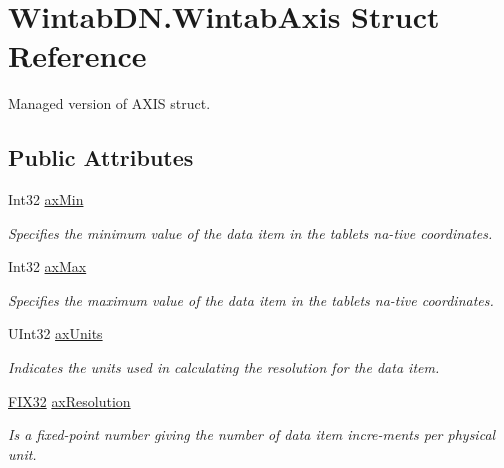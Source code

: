 \hypertarget{struct_wintab_d_n_1_1_wintab_axis}{}\section{Wintab\+D\+N.\+Wintab\+Axis Struct Reference}
\label{struct_wintab_d_n_1_1_wintab_axis}


Managed version of A\+X\+IS struct.  


\subsection*{Public Attributes}
\begin{DoxyCompactItemize}
\item 
Int32 \mbox{\hyperlink{struct_wintab_d_n_1_1_wintab_axis_a66135b352cd339fba0a8ab157d454d22}{ax\+Min}}
\begin{DoxyCompactList}\small\item\em Specifies the minimum value of the data item in the tablet\textquotesingle{}s na-\/tive coordinates. \end{DoxyCompactList}\item 
Int32 \mbox{\hyperlink{struct_wintab_d_n_1_1_wintab_axis_ad808a5058b80cd5b14e8dca275550cf7}{ax\+Max}}
\begin{DoxyCompactList}\small\item\em Specifies the maximum value of the data item in the tablet\textquotesingle{}s na-\/tive coordinates. \end{DoxyCompactList}\item 
U\+Int32 \mbox{\hyperlink{struct_wintab_d_n_1_1_wintab_axis_a571eed7c1e0ceb7cb44b1da7b2eaca69}{ax\+Units}}
\begin{DoxyCompactList}\small\item\em Indicates the units used in calculating the resolution for the data item. \end{DoxyCompactList}\item 
\mbox{\hyperlink{class_wintab_d_n_1_1_f_i_x32}{F\+I\+X32}} \mbox{\hyperlink{struct_wintab_d_n_1_1_wintab_axis_a811551f70bc21a049c9562eb8ab934da}{ax\+Resolution}}
\begin{DoxyCompactList}\small\item\em Is a fixed-\/point number giving the number of data item incre-\/ments per physical unit. \end{DoxyCompactList}\end{DoxyCompactItemize}


